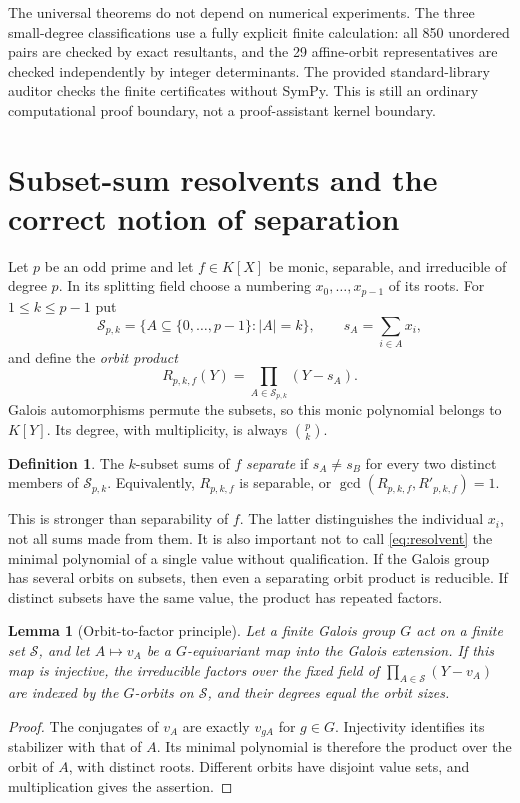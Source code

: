 \documentclass[11pt,a4paper]{article}
\newtheorem{lemma}[theorem]{Lemma}
\theoremstyle{definition}
\newtheorem{definition}[theorem]{Definition}
\theoremstyle{remark}
\begin{document}
The universal theorems do not depend on numerical experiments. The three
small-degree classifications use a fully explicit finite calculation: all
850 unordered pairs are checked by exact resultants, and the 29 affine-orbit
representatives are checked independently by integer determinants. The
provided standard-library auditor checks the finite certificates without
SymPy. This is still an ordinary computational proof boundary, not a
proof-assistant kernel boundary.

\section{Subset-sum resolvents and the correct notion of separation}
\label{sec:subset}

Let $p$ be an odd prime and let $f\in K[X]$ be monic, separable, and
irreducible of degree $p$. In its splitting field choose a numbering
$x_0,\ldots,x_{p-1}$ of its roots. For $1\leq k\leq p-1$ put
\[
 \mathcal S_{p,k}=\{A\subseteq\{0,\ldots,p-1\}:|A|=k\},\qquad
 s_A=\sum_{i\in A}x_i,
\]
and define the \emph{orbit product}
\begin{equation}
 R_{p,k,f}(Y)=\prod_{A\in\mathcal S_{p,k}}(Y-s_A).
 \label{eq:resolvent}
\end{equation}
Galois automorphisms permute the subsets, so this monic polynomial belongs
to $K[Y]$. Its degree, with multiplicity, is always $\binom pk$.

\begin{definition}
The $k$-subset sums of $f$ \emph{separate} if $s_A\neq s_B$ for every two
distinct members of $\mathcal S_{p,k}$. Equivalently,
$R_{p,k,f}$ is separable, or $\gcd(R_{p,k,f},R'_{p,k,f})=1$.
\end{definition}

This is stronger than separability of $f$. The latter distinguishes the
individual $x_i$, not all sums made from them. It is also important not to
call \eqref{eq:resolvent} the minimal polynomial of a single value without
qualification. If the Galois group has several orbits on subsets, then even
a separating orbit product is reducible. If distinct subsets have the same
value, the product has repeated factors.

\begin{lemma}[Orbit-to-factor principle]\label{lem:orbitfactor}
Let a finite Galois group $G$ act on a finite set $\mathcal S$, and let
$A\mapsto v_A$ be a $G$-equivariant map into the Galois extension. If this
map is injective, the irreducible factors over the fixed field of
$\prod_{A\in\mathcal S}(Y-v_A)$ are indexed by the $G$-orbits on
$\mathcal S$, and their degrees equal the orbit sizes.
\end{lemma}
\begin{proof}
The conjugates of $v_A$ are exactly $v_{gA}$ for $g\in G$. Injectivity
identifies its stabilizer with that of $A$. Its minimal polynomial is
therefore the product over the orbit of $A$, with distinct roots. Different
orbits have disjoint value sets, and multiplication gives the assertion.
\end{proof}
\end{document}
